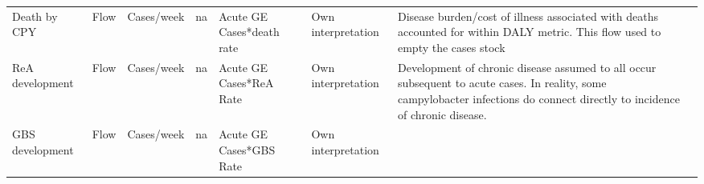 \begin{landscape}
\begin{longtable}[c]{m{10em}lllm{15em}lll}
Death by CPY                                  & Flow     & Cases/week               & na                        & Acute GE Cases*death rate                                                                                                                                                                                                                                                                & Own interpretation                                                                                                                                                                           & Disease burden/cost of illness associated with deaths accounted for within DALY metric. This flow used to empty the cases stock                                                                                                       \\
ReA development                               & Flow     & Cases/week               & na                        & Acute GE Cases*ReA Rate                                                                                                                                                                                                                                                                  & Own interpretation                                                                                                                                                                           & Development of chronic disease assumed to all occur subsequent to acute cases. In reality, some campylobacter infections do connect directly to incidence of chronic disease.                                                         \\
GBS development                               & Flow     & Cases/week               & na                        & Acute GE Cases*GBS Rate                                                                                                                                                                                                                                                                  & Own interpretation                                                                                                                                                                           &                                                                                                                                                                                                                                       \\

\end{longtable}
\end{landscape}

